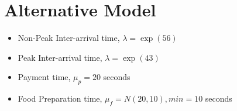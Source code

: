 \documentclass{article}
\begin{document}
\section*{Alternative Model}
\begin{itemize}
    \item Non-Peak Inter-arrival time, $\lambda = \exp(56)$
    \item Peak Inter-arrival time, $\lambda = \exp(43)$
    \item Payment time, $\mu_p = 20$ seconds
    \item Food Preparation time, $\mu_f = N(20,10), min=10$ seconds
\end{itemize}
\end{document}
